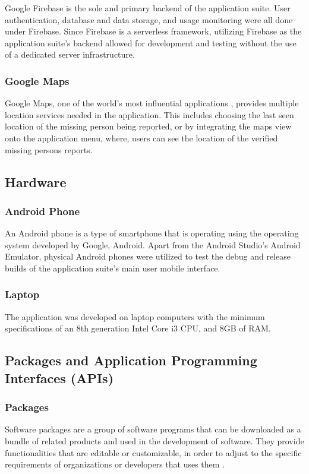 Google Firebase is the sole and primary backend of the application suite. User authentication, database and data storage, and usage monitoring were all done under Firebase. Since Firebase is a serverless framework, utilizing Firebase as the application suite's backend allowed for development and testing without the use of a dedicated server infrastructure. 

\subsubsection{Google Maps}
Google Maps, one of the world’s most influential applications \cite{mehta2019google}, provides multiple location services needed in the application. This includes choosing the last seen location of the missing person being reported, or by integrating the maps view onto the application menu, where, users can see the location of the verified missing persons reports. 

\subsection{Hardware}
\subsubsection{Android Phone}
An Android phone is a type of smartphone that is operating using the operating system developed by Google, Android. Apart from the Android Studio's Android Emulator,  physical Android phones were utilized to test the debug and release builds of the application suite's main user mobile interface.

\subsubsection{Laptop}
The application was developed on laptop computers with the minimum specifications of an 8th generation Intel Core i3 CPU, and 8GB of RAM.

\subsection{Packages and Application Programming Interfaces (APIs)}

\subsubsection{Packages}
Software packages are a group of software programs that can be downloaded as a bundle of related products and used in the development of software.  They provide functionalities that are editable or customizable, in order to adjust to the specific requirements of organizations or developers that uses them \cite{jadhav2009evaluating}.

